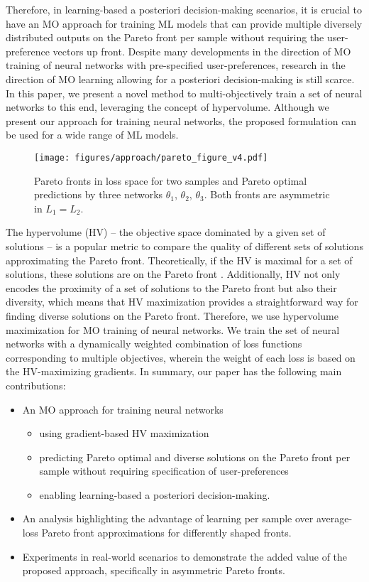 Therefore, in learning-based a posteriori decision-making scenarios, it is crucial to have an MO approach for training ML models that can provide multiple diversely distributed outputs on the Pareto front per sample without requiring the user-preference vectors up front. Despite many developments in the direction of MO training of neural networks with pre-specified user-preferences, research in the direction of MO learning allowing for a posteriori decision-making is still scarce. In this paper, we present a novel method to multi-objectively train a set of neural networks to this end, leveraging the concept of hypervolume. Although we present our approach for training neural networks, the proposed formulation can be used for a wide range of ML models. 

\begin{figure}[h!]
    \centering
    \texttt{[image: figures/approach/pareto\_figure\_v4.pdf]}
    \caption{Pareto fronts in loss space for two samples and Pareto optimal predictions by three networks $\theta_{1}$, $\theta_{2}$, $\theta_{3}$. Both fronts are asymmetric in $L_{1}=L_{2}$.}
    \label{fig:pareto_fronts}
\end{figure}

The hypervolume (HV) -- the objective space dominated by a given set of solutions \citep{zitzler1999multiobjective} -- is a popular metric to compare the quality of different sets of solutions approximating the Pareto front. Theoretically, if the HV is maximal for a set of solutions, these solutions are on the Pareto front \citep{fleischer2003measure}. Additionally, HV not only encodes the proximity of a set of solutions to the Pareto front but also their diversity, which means that HV maximization provides a straightforward way for finding diverse solutions on the Pareto front. Therefore, we use hypervolume maximization for MO training of neural networks. We train the set of neural networks with a dynamically weighted combination of loss functions corresponding to multiple objectives, wherein the weight of each loss is based on the HV-maximizing gradients. In summary, our paper has the following main contributions:
\begin{itemize}
    \item An MO approach for training neural networks 
    \begin{itemize}
        \item using gradient-based HV maximization
        \item predicting Pareto optimal and diverse solutions on the Pareto front per sample without requiring specification of user-preferences
        \item enabling learning-based a posteriori decision-making.%
    \end{itemize}
    \item An analysis highlighting the advantage of learning per sample over average-loss Pareto front approximations for differently shaped fronts.
    \item Experiments in real-world scenarios to demonstrate the added value of the proposed approach, specifically in asymmetric Pareto fronts.
\end{itemize}

